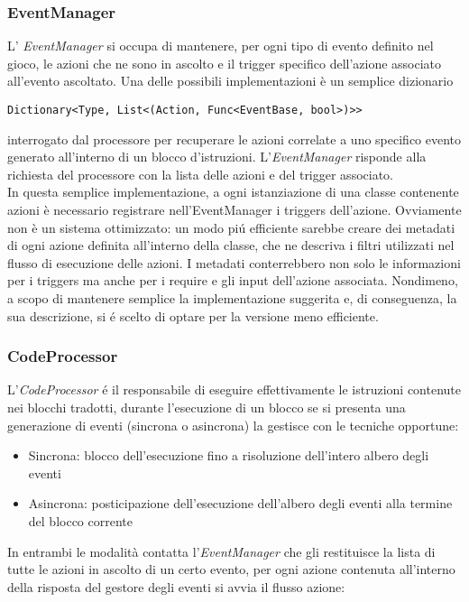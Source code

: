 \subsubsection{EventManager}
L' \textit{EventManager} si occupa di mantenere, per ogni tipo di evento definito nel gioco, 
le azioni che ne sono in ascolto e il trigger specifico dell'azione associato all'evento ascoltato. 
Una delle possibili implementazioni è un semplice dizionario
\begin{lstlisting}[style=sharpc_small]
Dictionary<Type, List<(Action, Func<EventBase, bool>)>>
\end{lstlisting}
interrogato dal processore per recuperare le azioni correlate a uno specifico evento generato all'interno di un blocco d'istruzioni.
L'\textit{EventManager} risponde alla richiesta del processore con la lista delle azioni e del trigger associato. \\ 
In questa semplice implementazione, a ogni istanziazione di una classe contenente azioni è necessario registrare nell'EventManager
i triggers dell'azione. Ovviamente non è un sistema ottimizzato: un modo piú efficiente sarebbe creare dei metadati di ogni azione definita 
all'interno della classe, che ne descriva i filtri utilizzati nel flusso di esecuzione delle azioni.
I metadati conterrebbero non solo le informazioni per i triggers ma anche per i require e gli input dell'azione associata.
Nondimeno, a scopo di mantenere semplice la implementazione suggerita e, di conseguenza, la sua descrizione, 
si é scelto di optare per la versione meno efficiente.

\subsubsection{CodeProcessor}
L'\textit{CodeProcessor} é il responsabile di eseguire effettivamente le istruzioni contenute nei blocchi tradotti, durante l'esecuzione 
di un blocco se si presenta una generazione di eventi (sincrona o asincrona) la gestisce con le tecniche opportune:
\begin{itemize}
    \item Sincrona: blocco dell'esecuzione fino a risoluzione dell'intero albero degli eventi
    \item Asincrona: posticipazione dell'esecuzione dell'albero degli eventi alla termine del blocco corrente
\end{itemize}
In entrambi le modalità contatta l'\textit{EventManager} che gli restituisce la lista di tutte le azioni in ascolto di un certo evento,
per ogni azione contenuta all'interno della risposta del gestore degli eventi si avvia il flusso azione:

